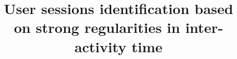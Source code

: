 \documentclass{sig-alternate}
\begin{document}
%

\title{User sessions identification based on strong regularities in inter-activity time}
%
%
%
%
%
\end{document}
